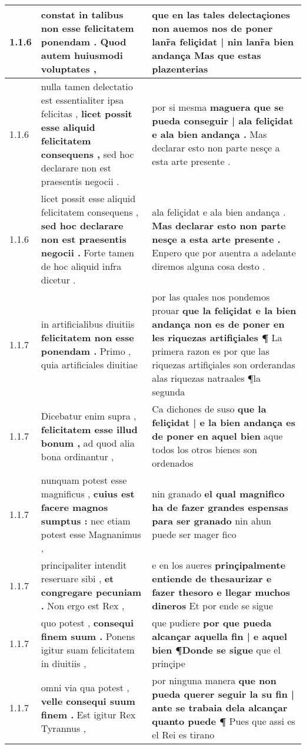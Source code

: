 \begin{tabular}{|p{1cm}|p{6.5cm}|p{6.5cm}|}
1.1.6 & constat in talibus \textbf{ non esse felicitatem ponendam . } Quod autem huiusmodi voluptates , & que en las tales delectaçiones \textbf{ non auemos nos de poner lanr̃a feliçidat | nin lanr̃a bien andança } Mas que estas plazenterias \\\hline
1.1.6 & nulla tamen delectatio est essentialiter ipsa felicitas , \textbf{ licet possit esse aliquid felicitatem consequens , } sed hoc declarare non est praesentis negocii . & por si mesma \textbf{ maguera que se pueda conseguir | ala feliçidat e ala bien andança . } Mas declarar esto non parte nesçe a esta arte presente . \\\hline
1.1.6 & licet possit esse aliquid felicitatem consequens , \textbf{ sed hoc declarare non est praesentis negocii . } Forte tamen de hoc aliquid infra dicetur . & ala feliçidat e ala bien andança . \textbf{ Mas declarar esto non parte nesçe a esta arte presente . } Enpero que por auentra a adelante diremos alguna cosa desto . \\\hline
1.1.7 & in artificialibus diuitiis \textbf{ felicitatem non esse ponendam . } Primo , quia artificiales diuitiae & por las quales nos pondemos prouar \textbf{ que la feliçidat e la bien andança non es de poner en les riquezas artifiçiales ¶ } La primera razon es por que las riquezas artifiçiales son orderandas alas riquezas natraales ¶la segunda \\\hline
1.1.7 & Dicebatur enim supra , \textbf{ felicitatem esse illud bonum , } ad quod alia bona ordinantur , & Ca dichones de suso \textbf{ que la feliçidat | e la bien andança es de poner en aquel bien } aque todos los otros bienes son ordenados \\\hline
1.1.7 & nunquam potest esse magnificus , \textbf{ cuius est facere magnos sumptus : } nec etiam potest esse Magnanimus , & nin granado \textbf{ el qual magnifico ha de fazer grandes espensas para ser granado } nin ahun puede ser mager fico \\\hline
1.1.7 & principaliter intendit reseruare sibi , \textbf{ et congregare pecuniam . } Non ergo est Rex , & e en los aueres \textbf{ prinçipalmente entiende de thesaurizar e fazer thesoro e llegar muchos dineros } Et por ende se sigue \\\hline
1.1.7 & quo potest , \textbf{ consequi finem suum . } Ponens igitur suam felicitatem in diuitiis , & que pudiere \textbf{ por que pueda alcançar aquella fin | e aquel bien ¶Donde se sigue } que el prinçipe \\\hline
1.1.7 & omni via qua potest , \textbf{ velle consequi suum finem . } Est igitur Rex Tyrannus , & por ninguna manera \textbf{ que non pueda querer seguir la su fin | ante se trabaia dela alcançar quanto puede ¶ } Pues que assi es el Rei es tirano \\\hline

\end{tabular}
